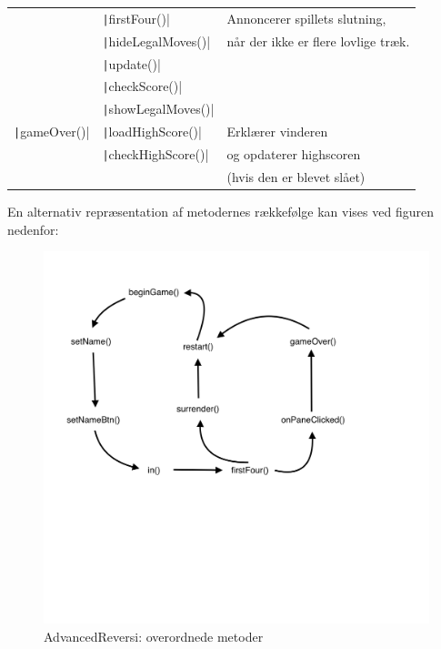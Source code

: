 \begin{table}[H]
\begin{tabular}{lll}
                                           & \texttt|firstFour()|      & Annoncerer spillets slutning,                 \\
                                           & \texttt|hideLegalMoves()| & når der ikke er flere lovlige træk.           \\
                                           & \texttt|update()|         &                                               \\
                                           & \texttt|checkScore()|     &                                               \\
                                           & \texttt|showLegalMoves()| &                                               \\
        \texttt|gameOver()|      & \texttt|loadHighScore()|  & Erklærer vinderen                             \\
                                           & \texttt|checkHighScore()| & og opdaterer highscoren                       \\
                                           &                                     & (hvis den er blevet slået)                    \\
        \bottomrule
    \end{tabular}
\end{table}
En alternativ repræsentation af metodernes rækkefølge kan vises ved figuren nedenfor:
\begin{figure}[H]
    \centering
    \caption{AdvancedReversi: overordnede metoder}\label{ARF}
    \includegraphics[width=.5\textwidth]{Graphics/Screenshot 2023-01-20 at 16.35.36.png}
\end{figure}

